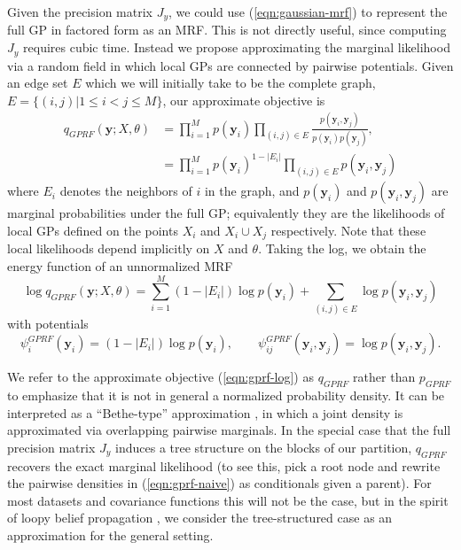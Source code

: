 \documentclass{article}
\renewcommand{\v}[1]{\mathbf{#1}}
\begin{document}
Given the precision matrix $J_y$, we could use (\ref{eqn:gaussian-mrf})
to represent the full GP in factored form as an MRF. This is not
directly useful, since computing $J_y$ requires cubic time. Instead we
propose approximating the marginal likelihood via a random field in
which local GPs are connected by pairwise potentials. Given an edge
set $E$ which we will initially take to be the complete graph, $E
=\{(i,j) | 1\le i < j \le M\}$, our approximate objective is
\begin{align}
q_{GPRF}(\v{y}; X, \theta)&= \prod_{i=1}^M p(\v{y}_i) 
\prod_{(i,j)\in E} \frac{p(\v{y}_i, \v{y}_j)}{p(\v{y}_i) p(\v{y}_j)},\label{eqn:gprf-naive}\\
&= \prod_{i=1}^M p(\v{y}_i)^{1-|E_i|} \prod_{(i,j)\in E} p(\v{y}_i, \v{y}_j) \nonumber
\end{align}
where $E_i$ denotes the neighbors of $i$ in the graph, and $p(\v{y}_i)$ and $p(\v{y}_{i},
\v{y}_j)$ are marginal probabilities under the full GP;
equivalently they are the likelihoods of local GPs
defined on the points $X_i$ and $X_i \cup X_j$ respectively. Note that
these local likelihoods depend implicitly on $X$ and $\theta$. Taking
the log, we obtain the energy function of an unnormalized MRF
\begin{equation}
\log q_{GPRF}(\v{y}; X, \theta) = \sum_{i=1}^M (1-|E_i|)\log p(\v{y}_i)
 + \sum_{(i,j)\in E} \log p(\v{y}_i, \v{y}_j)  \label{eqn:gprf-log}
\end{equation}
with potentials
\begin{equation}
\psi_i^{GPRF}(\v{y}_i) = (1-|E_i|)\log p(\v{y}_i), \qquad \psi_{ij}^{GPRF}(\v{y}_i, \v{y}_j) =
\log p(\v{y}_i, \v{y}_j).\end{equation}

We refer to the approximate objective (\ref{eqn:gprf-log}) as $q_{GPRF}$ rather than $p_{GPRF}$
to emphasize that it is not in general a normalized probability
density. It can be interpreted as a ``Bethe-type'' approximation
\cite{yedidia2001bethe}, in which a joint density is approximated via overlapping pairwise marginals. In the special
case that the full precision matrix $J_y$ induces a tree structure on
the blocks of our partition, $q_{GPRF}$ recovers the exact marginal likelihood (to
see this, pick a root node and rewrite the pairwise densities in
(\ref{eqn:gprf-naive}) as
conditionals given a parent). For most datasets and covariance
functions this will not be the case, but in the spirit of loopy belief propagation \cite{murphy1999loopy}, we 
consider the tree-structured case as an approximation for the general setting.
\end{document}
